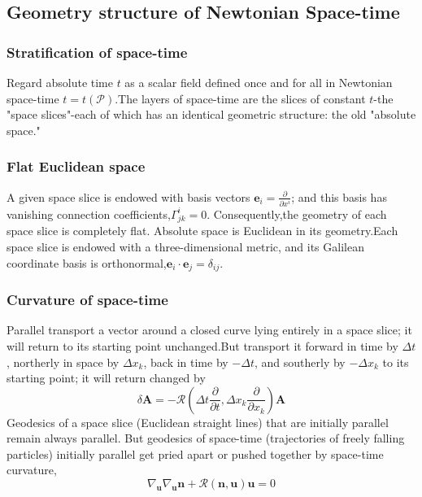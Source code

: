 \documentclass{article}
\begin{document}
\subsection{Geometry structure of Newtonian Space-time}
\subsubsection*{Stratification of space-time}
Regard absolute time $t$ as a scalar field defined once and for all in Newtonian space-time $t=t(\mathcal{P})$.The layers of space-time are the slices of constant $t$-the "space slices"-each of which has an identical geometric structure: the old "absolute space."
\subsubsection*{Flat Euclidean space}
A given space slice is endowed with basis vectors $\mathbf{e}_i = \frac{\partial}{\partial x^i}$; and this basis has vanishing connection coefficients,$\Gamma^i_{jk} = 0$. Consequently,the geometry of each space slice is completely flat. Absolute space is Euclidean in its geometry.Each space slice is endowed with a three-dimensional metric, and its Galilean coordinate basis is orthonormal,$\mathbf{e}_i \cdot \mathbf{e}_j = \delta_{ij}$.
\subsubsection*{Curvature of space-time}
Parallel transport a vector around a closed curve lying entirely in a space slice; it will return to its starting point unchanged.But transport it forward in time by $\Delta t$, northerly in space by $\Delta x_k$, back in time by $-\Delta t$, and southerly by $-\Delta x_k$ to its starting point; it will return changed by
\[\delta \mathbf{A} = -\mathcal{R}(\Delta t \frac{\partial}{\partial t},\Delta x_k \frac{\partial}{\partial x_k}) \mathbf{A}\]
Geodesics of a space slice (Euclidean straight lines) that are initially parallel remain always parallel. But geodesics of space-time (trajectories of freely falling particles) initially parallel get pried apart or pushed together by space-time curvature,
\[\nabla_{\mathbf{u}} \nabla_{\mathbf{u}} \mathbf{n} + \mathcal{R}(\mathbf{n},\mathbf{u})\mathbf{u} = 0\]
\end{document}

